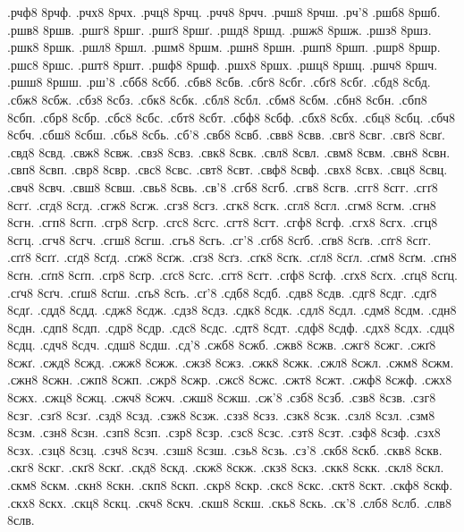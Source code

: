 {.рчф8
8рчф.
.рчх8
8рчх.
.рчц8
8рчц.
.рчч8
8рчч.
.рчш8
8рчш.
.рч'8
.ршб8
8ршб.
.ршв8
8ршв.
.ршг8
8ршг.
.ршґ8
8ршґ.
.ршд8
8ршд.
.ршж8
8ршж.
.ршз8
8ршз.
.ршк8
8ршк.
.ршл8
8ршл.
.ршм8
8ршм.
.ршн8
8ршн.
.ршп8
8ршп.
.ршр8
8ршр.
.ршс8
8ршс.
.ршт8
8ршт.
.ршф8
8ршф.
.ршх8
8ршх.
.ршц8
8ршц.
.ршч8
8ршч.
.ршш8
8ршш.
.рш'8
.сбб8
8сбб.
.сбв8
8сбв.
.сбг8
8сбг.
.сбґ8
8сбґ.
.сбд8
8сбд.
.сбж8
8сбж.
.сбз8
8сбз.
.сбк8
8сбк.
.сбл8
8сбл.
.сбм8
8сбм.
.сбн8
8сбн.
.сбп8
8сбп.
.сбр8
8сбр.
.сбс8
8сбс.
.сбт8
8сбт.
.сбф8
8сбф.
.сбх8
8сбх.
.сбц8
8сбц.
.сбч8
8сбч.
.сбш8
8сбш.
.сбь8
8сбь.
.сб'8
.свб8
8свб.
.свв8
8свв.
.свг8
8свг.
.свґ8
8свґ.
.свд8
8свд.
.свж8
8свж.
.свз8
8свз.
.свк8
8свк.
.свл8
8свл.
.свм8
8свм.
.свн8
8свн.
.свп8
8свп.
.свр8
8свр.
.свс8
8свс.
.свт8
8свт.
.свф8
8свф.
.свх8
8свх.
.свц8
8свц.
.свч8
8свч.
.свш8
8свш.
.свь8
8свь.
.св'8
.сгб8
8сгб.
.сгв8
8сгв.
.сгг8
8сгг.
.сгґ8
8сгґ.
.сгд8
8сгд.
.сгж8
8сгж.
.сгз8
8сгз.
.сгк8
8сгк.
.сгл8
8сгл.
.сгм8
8сгм.
.сгн8
8сгн.
.сгп8
8сгп.
.сгр8
8сгр.
.сгс8
8сгс.
.сгт8
8сгт.
.сгф8
8сгф.
.сгх8
8сгх.
.сгц8
8сгц.
.сгч8
8сгч.
.сгш8
8сгш.
.сгь8
8сгь.
.сг'8
.сґб8
8сґб.
.сґв8
8сґв.
.сґг8
8сґг.
.сґґ8
8сґґ.
.сґд8
8сґд.
.сґж8
8сґж.
.сґз8
8сґз.
.сґк8
8сґк.
.сґл8
8сґл.
.сґм8
8сґм.
.сґн8
8сґн.
.сґп8
8сґп.
.сґр8
8сґр.
.сґс8
8сґс.
.сґт8
8сґт.
.сґф8
8сґф.
.сґх8
8сґх.
.сґц8
8сґц.
.сґч8
8сґч.
.сґш8
8сґш.
.сґь8
8сґь.
.сґ'8
.сдб8
8сдб.
.сдв8
8сдв.
.сдг8
8сдг.
.сдґ8
8сдґ.
.сдд8
8сдд.
.сдж8
8сдж.
.сдз8
8сдз.
.сдк8
8сдк.
.сдл8
8сдл.
.сдм8
8сдм.
.сдн8
8сдн.
.сдп8
8сдп.
.сдр8
8сдр.
.сдс8
8сдс.
.сдт8
8сдт.
.сдф8
8сдф.
.сдх8
8сдх.
.сдц8
8сдц.
.сдч8
8сдч.
.сдш8
8сдш.
.сд'8
.сжб8
8сжб.
.сжв8
8сжв.
.сжг8
8сжг.
.сжґ8
8сжґ.
.сжд8
8сжд.
.сжж8
8сжж.
.сжз8
8сжз.
.сжк8
8сжк.
.сжл8
8сжл.
.сжм8
8сжм.
.сжн8
8сжн.
.сжп8
8сжп.
.сжр8
8сжр.
.сжс8
8сжс.
.сжт8
8сжт.
.сжф8
8сжф.
.сжх8
8сжх.
.сжц8
8сжц.
.сжч8
8сжч.
.сжш8
8сжш.
.сж'8
.сзб8
8сзб.
.сзв8
8сзв.
.сзг8
8сзг.
.сзґ8
8сзґ.
.сзд8
8сзд.
.сзж8
8сзж.
.сзз8
8сзз.
.сзк8
8сзк.
.сзл8
8сзл.
.сзм8
8сзм.
.сзн8
8сзн.
.сзп8
8сзп.
.сзр8
8сзр.
.сзс8
8сзс.
.сзт8
8сзт.
.сзф8
8сзф.
.сзх8
8сзх.
.сзц8
8сзц.
.сзч8
8сзч.
.сзш8
8сзш.
.сзь8
8сзь.
.сз'8
.скб8
8скб.
.скв8
8скв.
.скг8
8скг.
.скґ8
8скґ.
.скд8
8скд.
.скж8
8скж.
.скз8
8скз.
.скк8
8скк.
.скл8
8скл.
.скм8
8скм.
.скн8
8скн.
.скп8
8скп.
.скр8
8скр.
.скс8
8скс.
.скт8
8скт.
.скф8
8скф.
.скх8
8скх.
.скц8
8скц.
.скч8
8скч.
.скш8
8скш.
.скь8
8скь.
.ск'8
.слб8
8слб.
.слв8
8слв.
}
